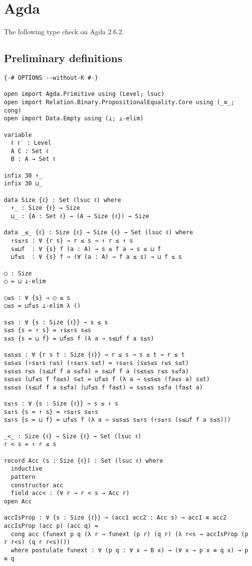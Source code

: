 \section{Agda}

The following type check on Agda 2.6.2.

\subsection{Preliminary definitions} \label{app:mechanization:agda:prelim}

\begin{singlespace}
\begin{verbatim}
{-# OPTIONS --without-K #-}

open import Agda.Primitive using (Level; lsuc)
open import Relation.Binary.PropositionalEquality.Core using (_≡_; cong)
open import Data.Empty using (⊥; ⊥-elim)

variable
  ℓ ℓ′ : Level
  A C : Set ℓ
  B : A → Set ℓ

infix 30 ↑_
infix 30 ⊔_

data Size {ℓ} : Set (lsuc ℓ) where
  ↑_ : Size {ℓ} → Size
  ⊔_ : {A : Set ℓ} → (A → Size {ℓ}) → Size

data _≤_ {ℓ} : Size {ℓ} → Size {ℓ} → Set (lsuc ℓ) where
  ↑s≤↑s : ∀ {r s} → r ≤ s → ↑ r ≤ ↑ s
  s≤⊔f  : ∀ {s} f (a : A) → s ≤ f a → s ≤ ⊔ f
  ⊔f≤s  : ∀ {s} f → (∀ (a : A) → f a ≤ s) → ⊔ f ≤ s

◯ : Size
◯ = ⊔ ⊥-elim

◯≤s : ∀ {s} → ◯ ≤ s
◯≤s = ⊔f≤s ⊥-elim λ ()

s≤s : ∀ {s : Size {ℓ}} → s ≤ s
s≤s {s = ↑ s} = ↑s≤↑s s≤s
s≤s {s = ⊔ f} = ⊔f≤s f (λ a → s≤⊔f f a s≤s)

s≤s≤s : ∀ {r s t : Size {ℓ}} → r ≤ s → s ≤ t → r ≤ t
s≤s≤s (↑s≤↑s r≤s) (↑s≤↑s s≤t) = ↑s≤↑s (s≤s≤s r≤s s≤t)
s≤s≤s r≤s (s≤⊔f f a s≤fa) = s≤⊔f f a (s≤s≤s r≤s s≤fa)
s≤s≤s (⊔f≤s f fa≤s) s≤t = ⊔f≤s f (λ a → s≤s≤s (fa≤s a) s≤t)
s≤s≤s (s≤⊔f f a s≤fa) (⊔f≤s f fa≤t) = s≤s≤s s≤fa (fa≤t a)

s≤↑s : ∀ {s : Size {ℓ}} → s ≤ ↑ s
s≤↑s {s = ↑ s} = ↑s≤↑s s≤↑s
s≤↑s {s = ⊔ f} = ⊔f≤s f (λ a → s≤s≤s s≤↑s (↑s≤↑s (s≤⊔f f a s≤s)))

_<_ : Size {ℓ} → Size {ℓ} → Set (lsuc ℓ)
r < s = ↑ r ≤ s

record Acc (s : Size {ℓ}) : Set (lsuc ℓ) where
  inductive
  pattern
  constructor acc
  field acc< : (∀ r → r < s → Acc r)
open Acc

accIsProp : ∀ {s : Size {ℓ}} → (acc1 acc2 : Acc s) → acc1 ≡ acc2
accIsProp (acc p) (acc q) =
  cong acc (funext p q (λ r → funext (p r) (q r) (λ r<s → accIsProp (p r r<s) (q r r<s))))
  where postulate funext : ∀ (p q : ∀ x → B x) → (∀ x → p x ≡ q x) → p ≡ q


\end{verbatim}
\end{singlespace}
